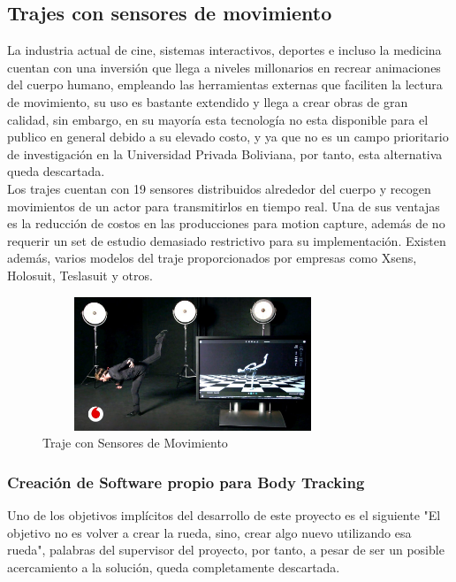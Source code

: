 \subsection{Trajes con sensores de movimiento}

La industria actual de cine, sistemas interactivos, deportes e incluso la medicina cuentan con una inversión que llega a niveles millonarios en recrear animaciones del cuerpo humano, empleando las herramientas externas que faciliten la lectura de movimiento, su uso es bastante extendido y llega a crear obras de gran calidad, sin embargo, en su mayoría esta tecnología no esta disponible para el publico en general debido a su elevado costo, y ya que no es un campo prioritario de investigación en la Universidad Privada Boliviana, por tanto, esta alternativa queda descartada.
\\
Los trajes cuentan con 19 sensores distribuidos alrededor del cuerpo y recogen movimientos de un actor para transmitirlos en tiempo real. Una de sus ventajas es la reducción de costos en las producciones para motion capture, además de no requerir un set de estudio demasiado restrictivo para su implementación. Existen además, varios modelos del traje proporcionados por empresas como Xsens, Holosuit, Teslasuit y otros.

\begin{figure}[t!]
	\centering
	\includegraphics[width=9cm,height=4cm,]{./Images/trajesensor.jpg}
	\caption{Traje con Sensores de Movimiento}
	\label{trajesensores}
\end{figure}

\subsubsection{Creación de Software propio para Body Tracking}

Uno de los objetivos implícitos del desarrollo de este proyecto es el siguiente "El objetivo no es volver a crear la rueda, sino, crear algo nuevo utilizando esa rueda", palabras del supervisor del proyecto, por tanto, a pesar de ser un posible acercamiento a la solución, queda completamente descartada.

